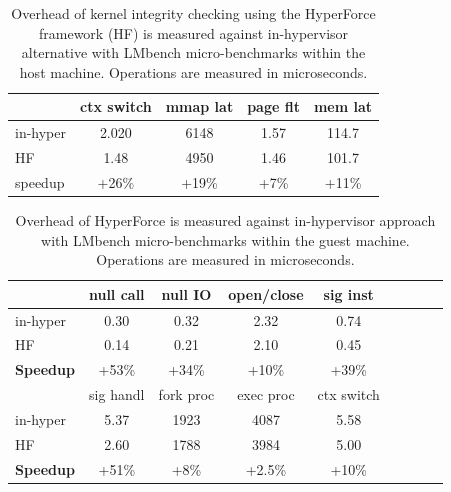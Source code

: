 \begin{table}[htdp]
\caption{Overhead of kernel integrity checking using the HyperForce framework (HF) is measured against in-hypervisor alternative with LMbench micro-benchmarks within the host machine. Operations are measured in microseconds.}
\begin{center}
\begin{tabular}{| l | c | c | c | c | }
\hline
~ & ctx switch  & mmap lat  & page flt 	 & mem lat \\
\hline
in-hyper     & 2.020  &	6148	&	1.57		&114.7  \\
HF		& 1.48    &	4950	&	1.46		& 101.7 \\
\hline
speedup         &+26\% & +19\% & +7\% & +11\% \\
\hline
\end{tabular}
\end{center}
\label{hostmicro}
\end{table}%

\begin{table}[htdp]
\caption{Overhead of HyperForce is measured against in-hypervisor approach with
LMbench micro-benchmarks within the guest machine. Operations are measured in microseconds.}
\begin{center}
\begin{tabular}{| l | c | c | c | c | c | c | c | c |  }
\hline
  ~            & null call  & null IO & open/close & sig inst   \\  
\hline
in-hyper & 0.30 & 0.32 & 2.32 & 0.74   \\
HF    & 0.14 & 0.21 & 2.10 & 0.45  \\  
\hline
\bf{Speedup}      &  +53\%   & +34\%    &  +10\%    & +39\%      \\
\hline
\hline

~ & sig handl & fork proc & exec proc & ctx switch \\
\hline
in-hyper 			& 5.37 & 1923 & 4087 & 5.58 \\
HF 		& 2.60 & 1788 & 3984 & 5.00 \\

\hline
\bf{Speedup}			& +51\%    & +8\%       & +2.5\%     &  +10\% \\
\hline

\end{tabular}
\end{center}
\label{guestmicro}
\end{table}%



